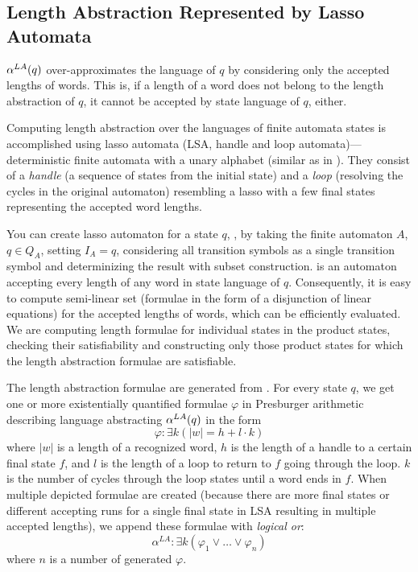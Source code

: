 \subsection{Length Abstraction Represented by Lasso Automata} \label{sec:length_abstraction}

$\alpha^{LA}(q)$ over-approximates the language of $q$ by considering only the accepted lengths of words. This is, if a length of a word does not belong to the length abstraction of $q$, it cannot be accepted by state language of $q$, either.

Computing length abstraction over the languages of finite automata states is accomplished using lasso automata (LSA, handle and loop automata)---deterministic finite automata with a unary alphabet (similar as in \cite{10.1007/978-3-319-08867-9_10}). They consist of a \emph{handle} (a sequence of states from the initial state) and a \emph{loop} (resolving the cycles in the original automaton) resembling a lasso with a few final states representing the accepted word lengths.

You can create lasso automaton for a state $q$, , by taking the finite automaton $A$, $q \in Q_A$, setting $ I_A = {q} $, considering all transition symbols as a single transition symbol and determinizing the result with subset construction.  is an automaton accepting every length of any word in state language of $q$. Consequently, it is easy to compute semi-linear set (formulae in the form of a disjunction of linear equations) for the accepted lengths of words, which can be efficiently evaluated. We are computing length formulae for individual states in the product states, checking their satisfiability and constructing only those product states for which the length abstraction formulae are satisfiable.

The length abstraction formulae are generated from . For every state $q$, we get one or more existentially quantified formulae $\varphi$ in Presburger arithmetic describing language abstracting $\alpha^{LA}(q)$ in the form
\[
    \varphi: \exists k ( |w| = h + l \cdot k )
\]
where $|w|$ is a length of a recognized word, $h$ is the length of a handle to a certain final state $f$, and $l$ is the length of a loop to return to $f$ going through the loop. $k$ is the number of cycles through the loop states until a word ends in $f$. When multiple depicted formulae are created (because there are more final states or different accepting runs for a single final state in LSA resulting in multiple accepted lengths), we append these formulae with \emph{logical or}:
\[
    \alpha^{LA} : \exists k ( \varphi_1 \lor \ldots \lor \varphi_n )
\]
where $n$ is a number of generated $\varphi$.

